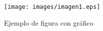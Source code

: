\begin{figure}[!th]
\begin{center}
\texttt{[image: images/imagen1.eps]}
\caption{Ejemplo de figura con gráfico}
\label{fig}
\end{center}
\end{figure}
